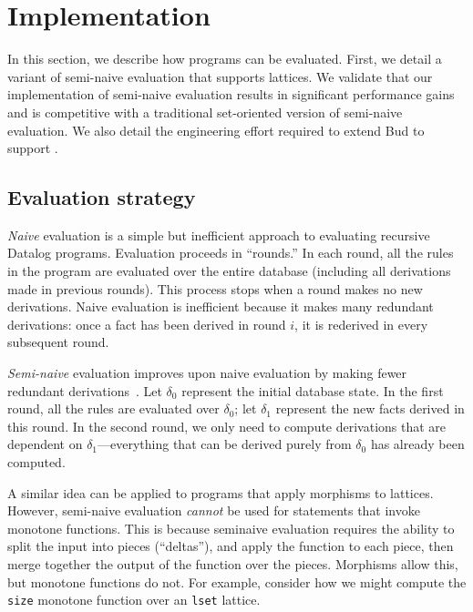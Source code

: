 \section{Implementation}
\label{sec:impl}

In this section, we describe how \lang programs can be evaluated. First, we
detail a variant of semi-naive evaluation that supports lattices. We validate
that our implementation of semi-naive evaluation results in significant
performance gains and is competitive with a traditional set-oriented version of
semi-naive evaluation. We also detail the engineering effort required to extend
Bud to support \lang. %

\subsection{Evaluation strategy}
\label{sec:lattice-eval-strat}
\emph{Naive} evaluation is a simple but inefficient approach to evaluating
recursive Datalog programs. Evaluation proceeds in ``rounds.'' In each round, all
the rules in the program are evaluated over the entire database (including all
derivations made in previous rounds). This process stops when a round makes no
new derivations. Naive evaluation is inefficient because it makes many redundant
derivations: once a fact has been derived in round $i$, it is rederived in every
subsequent round.

\emph{Semi-naive} evaluation improves upon naive evaluation by making fewer
redundant derivations~\cite{Balbin1987}. Let $\delta_0$ represent the initial
database state. In the first round, all the rules are evaluated over $\delta_0$;
let $\delta_1$ represent the new facts derived in this round. In the second
round, we only need to compute derivations that are dependent on
$\delta_1$---everything that can be derived purely from $\delta_0$ has already
been computed.

A similar idea can be applied to \lang programs that apply morphisms to
lattices. However, semi-naive evaluation \emph{cannot} be used for \lang
statements that invoke monotone functions. This is because seminaive evaluation
requires the ability to split the input into pieces (``deltas''), and apply the
function to each piece, then merge together the output of the function over the
pieces. Morphisms allow this, but monotone functions do not. For example,
consider how we might compute the \texttt{size} monotone function over an
\texttt{lset} lattice.


